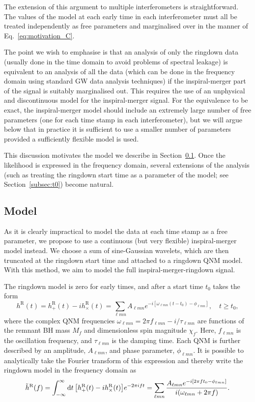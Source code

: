 The extension of this argument to multiple interferometers is straightforward. 
The values of the model at each early time in each interferometer must all be treated independently as free parameters and marginalised over in the manner of Eq.~\ref{eq:motivation_C}.

The point we wish to emphasise is that an analysis of only the ringdown data (usually done in the time domain to avoid problems of spectral leakage) is equivalent to an analysis of all the data (which can be done in the frequency domain using standard GW data analysis techniques) if the inspiral-merger part of the signal is suitably marginalised out. 
This requires the use of an unphysical and discontinuous model for the inspiral-merger signal.
For the equivalence to be exact, the inspiral-merger model should include an extremely large number of free parameters (one for each time stamp in each interferometer), but we will argue below that in practice it is sufficient to use a smaller number of parameters provided a sufficiently flexible model is used.

This discussion motivates the model we describe in Section~\ref{subsec:model}. Once the likelihood is expressed in the frequency domain, several extensions of the analysis (such as treating the ringdown start time as a parameter of the model; see Section~\ref{subsec:t0}) become natural.


\subsection{Model}\label{subsec:model}

As it is clearly impractical to model the data at each time stamp as a free parameter, we propose to use a continuous (but very flexible) inspiral-merger model instead. 
We choose a sum of sine-Gaussian wavelets, which are then truncated at the ringdown start time and attached to a ringdown QNM model. 
With this method, we aim to model the full inspiral-merger-ringdown signal.

The ringdown model is zero for early times, and after a start time $t_0$ takes the form
\begin{equation}
    h^\mathrm{R}(t) = h_+^\mathrm{R}(t) - ih_\times^\mathrm{R}(t) = \sum_{\ell m n} A_{\ell m n} e^{-i[\omega_{\ell m n}(t-t_0) - \phi_{\ell m n}]}, \quad t \geq t_0,
\end{equation}
where the complex QNM frequencies $\omega_{\ell m n} = 2\pi f_{\ell m n} - i/\tau_{\ell m n}$ are functions of the remnant BH mass $M_f$ and dimensionless spin magnitude $\chi_f$. Here, $f_{\ell m n}$ is the oscillation frequency, and $\tau_{\ell m n}$ is the damping time.
Each QNM is further described by an amplitude, $A_{\ell m n}$, and phase parameter, $\phi_{\ell m n}$. 
It is possible to analytically take the Fourier transform of this expression and thereby write the ringdown model in the frequency domain as
\begin{equation}
    \Tilde{h}^{\mathrm{R}}(f) = \int_{-\infty}^\infty \dd{t} \qty[h_+^\mathrm{R}(t) - ih_\times^\mathrm{R}(t)] e^{-2\pi i f t} = \sum_{\ell m n} \frac{A_{\ell m n} e^{-i[2\pi ft_0 - \phi_{\ell m n}]}}{i(\omega_{\ell m n} + 2\pi f)}.
\end{equation}

